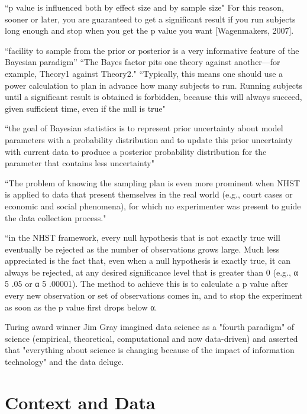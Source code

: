 \documentclass[inte,nonblindrev]{informs3} %
\begin{document}
``p value is influenced both by effect size and by sample size"\citep[pp. 787]{wagenmakers2007practical}
For this reason, sooner or later, you are guaranteed to get a significant result if you run subjects long enough and stop when you get the p value you want [Wagenmakers, 2007].

``facility to sample from the prior or posterior is a very informative feature of the Bayesian paradigm''\cite{tipping2004bayesian}
``The Bayes factor pits one theory against another—for example, Theory1 against Theory2."\citep[p. 277]{dienes2011bayesian}
``Typically, this means one should use a power calculation to plan in advance how many subjects to run. Running subjects until a significant result is obtained is forbidden, because this will always succeed,  given sufficient time, even if the null is true"\citep[p. 278]{dienes2011bayesian}

``the goal of Bayesian statistics is to represent prior uncertainty about model parameters with a probability distribution and to update this prior uncertainty with current data to produce a posterior probability distribution for the parameter that contains less uncertainty"\citep[p. 50]{lynch2007introduction}

``The problem of knowing the sampling plan is even more prominent when NHST is applied to data that present themselves in the real
world (e.g., court cases or economic and social phenomena), for which no experimenter was present to guide the data collection process."\citep[pp. 784]{wagenmakers2007practical}

``in the NHST framework, every null hypothesis that is not exactly true will eventually be rejected as the number of observations grows large. Much less appreciated is the fact that, even when a null hypothesis is exactly true, it can always be rejected, at any desired significance level that is greater than 0 (e.g., α 5 .05 or α 5 .00001). The method to achieve this is to calculate a p value after every new observation or set of observations comes in, and to stop the experiment as soon as the p value first drops below α.\citep[pp. 784]{wagenmakers2007practical} 

Turing award winner Jim Gray imagined data science as a "fourth paradigm" of science (empirical, theoretical, computational and now data-driven) and asserted that "everything about science is changing because of the impact of information technology" and the data deluge.\citep{bell2009beyond, hey2009fourth}
\section*{Context and Data}
\end{document}
